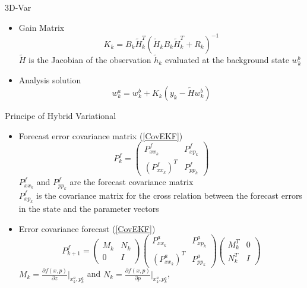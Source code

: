 \documentclass{beamer}
\begin{document}
\begin{frame}{3D-Var}
\begin{itemize}
    \item Gain Matrix 
        \begin{equation}
        K_k =  B_k \tilde H_k^T(  \tilde H_k B_k \tilde H_k^T + R_k)^{-1}
        \label{matrixGain3D}
        \end{equation}
    $\tilde H$ is the Jacobian of the observation $\tilde h_k$ evaluated at the background state $w_k^b$
    \item Analysis solution 
        \begin{equation}
        w_k^a = w_k^b + K_k (y_k - \tilde H w_k^b)
        \label{sol3D}
        \end{equation}
\end{itemize}
\end{frame}
\begin{frame}{Principe of Hybrid Variational}
\begin{itemize}
    \item Forecast error covariance matrix  (\ref{CovEKF}) 
        \begin{equation}
            P_k^f = 
        \begin{pmatrix}
        P_{xx_k}^f  & P_{xp_k}^f \\
        (P_{xx_k}^f)^T &  P_{pp_k}^f 
        \end{pmatrix}  
        \end{equation}
        $P_{xx_k}^f $  and $P_{pp_k}^f $ are the forecast covariance matrix \\
        $P_{xp_k}^f $ is the covariance matrix for the cross relation between the forecast errors in the state and the parameter vectors \\
        
    \item Error covariance forecast (\ref{CovEKF}) 
        \begin{equation}
        P_{k+1}^f =  
        \begin{pmatrix}
        M_k & N_k \\
        0  & I
        \end{pmatrix}
        \begin{pmatrix}
        P_{xx_k}^a & P_{xp_k}^a \\
        (P_{xx_k}^a)^T &  P_{pp_k}^a
        \end{pmatrix}
        \begin{pmatrix}
        M_k^T & 0 \\
         N_k^T & I
        \end{pmatrix}
        \end{equation}
        $M_k = \frac{\partial f(x,p) }{ \partial z} \big|_{x_k^a, p_k^a} $ and $N_k = \frac{\partial f(x,p)}{  \partial p } \big|_{x_k^a, p_k^a}$,
\end{itemize}
\end{frame}
\end{document}
